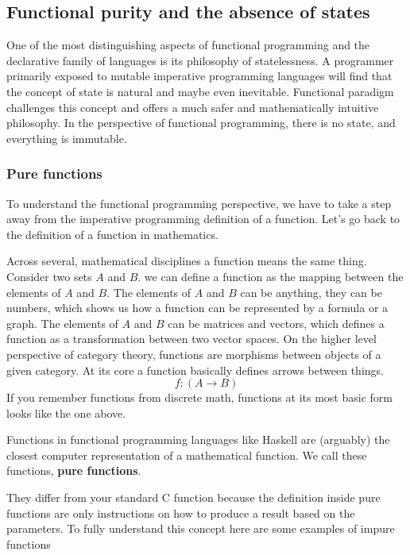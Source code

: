 \subsection{Functional purity and the absence of
states}\label{functional-programming-paradigm.md__functional-purity-and-the-absence-of-states}

One of the most distinguishing aspects of functional programming and the
declarative family of languages is its philosophy of statelessness. A
programmer primarily exposed to mutable imperative programming languages
will find that the concept of state is natural and maybe even
inevitable. Functional paradigm challenges this concept and offers a
much safer and mathematically intuitive philosophy. In the perspective
of functional programming, there is no state, and everything is
immutable.

\subsubsection{Pure
functions}\label{functional-programming-paradigm.md__pure-functions}

To understand the functional programming perspective, we have to take a
step away from the imperative programming definition of a function.
Let's go back to the definition of a function in mathematics.

Across several, mathematical disciplines a function means the same
thing. Consider two sets \(A\) and \(B\). we can define a function as
the mapping between the elements of \(A\) and \(B\). The elements of
\(A\) and \(B\) can be anything, they can be numbers, which shows us how
a function can be represented by a formula or a graph. The elements of
\(A\) and \(B\) can be matrices and vectors, which defines a function as
a transformation between two vector spaces. On the higher level
perspective of category theory, functions are morphisms between objects
of a given category. At its core a function basically defines arrows
between things. \[
f:(A\to B)
\] If you remember functions from discrete math, functions at its most
basic form looks like the one above.

Functions in functional programming languages like Haskell are
(arguably) the closest computer representation of a mathematical
function. We call these functions, \textbf{pure functions}.

They differ from your standard C function because the definition inside
pure functions are only instructions on how to produce a result based on
the parameters. To fully understand this concept here are some examples
of impure functions

